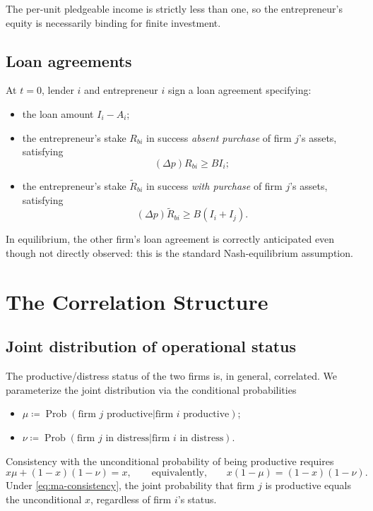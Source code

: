 \documentclass[11pt,a4paper,oneside]{book}
\def\geq{\geqslant}
\DeclareMathOperator{\Prob}{Prob}
\theoremstyle{plain}
\theoremstyle{definition}
\theoremstyle{remark}
\numberwithin{equation}{chapter}
\begin{document}
The per-unit pledgeable income is strictly less than one, so the entrepreneur's equity is necessarily binding for finite investment.

\subsection{Loan agreements}

At $t = 0$, lender $i$ and entrepreneur $i$ sign a loan agreement specifying:
\begin{itemize}
  \item the loan amount $I_i - A_i$;
  \item the entrepreneur's stake $R_{b i}$ in success \emph{absent purchase} of firm $j$'s assets, satisfying
  \begin{equation}\label{eq:ma-IC-no-purchase}
    (\Delta p) R_{b i} \geq B I_i;
  \end{equation}
  \item the entrepreneur's stake $\widetilde{R}_{b i}$ in success \emph{with purchase} of firm $j$'s assets, satisfying
  \begin{equation}\label{eq:ma-IC-purchase}
    (\Delta p) \widetilde{R}_{b i} \geq B (I_i + I_j).
  \end{equation}
\end{itemize}
In equilibrium, the other firm's loan agreement is correctly anticipated even though not directly observed: this is the standard Nash-equilibrium assumption.

\section{The Correlation Structure}
\label{sec:ma-correlation}

\subsection{Joint distribution of operational status}

The productive/distress status of the two firms is, in general, correlated.
We parameterize the joint distribution via the conditional probabilities
\begin{itemize}
  \item $\mu \coloneqq \Prob(\text{firm } j \text{ productive} \vert \text{firm } i \text{ productive})$;
  \item $\nu \coloneqq \Prob(\text{firm } j \text{ in distress} \vert \text{firm } i \text{ in distress})$.
\end{itemize}
Consistency with the unconditional probability of being productive requires
\begin{equation}\label{eq:ma-consistency}
  x \mu + (1 - x)(1 - \nu) = x,
  \qquad \text{equivalently,} \qquad
  x(1 - \mu) = (1 - x)(1 - \nu).
\end{equation}
Under \eqref{eq:ma-consistency}, the joint probability that firm $j$ is productive equals the unconditional $x$, regardless of firm $i$'s status.
\end{document}
